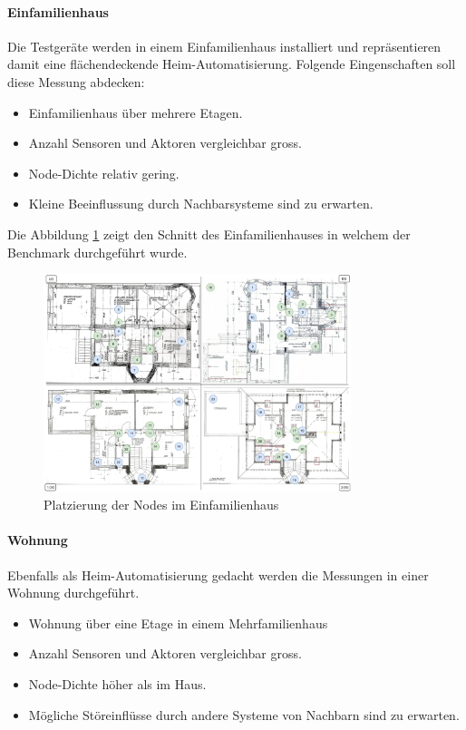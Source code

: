 \newpage
\paragraph{Einfamilienhaus}
Die Testgeräte werden in einem Einfamilienhaus installiert und repräsentieren damit eine flächendeckende Heim-Automatisierung. Folgende Eingenschaften soll diese Messung abdecken:
\begin{itemize}
	\item Einfamilienhaus über mehrere Etagen.
	\item Anzahl Sensoren und Aktoren vergleichbar gross.
	\item Node-Dichte relativ gering.
	\item Kleine Beeinflussung durch Nachbarsysteme sind zu erwarten.
\end{itemize}

Die Abbildung \ref{fig:Messumgebung2Einfamilienhaus} zeigt den Schnitt des Einfamilienhauses in welchem der Benchmark durchgeführt wurde.
\begin{figure}[h]
	\centering
	\includegraphics[width=0.8\textwidth]{graphics/Plan_Haus_Raffi.png}
	\caption{Platzierung der Nodes im Einfamilienhaus}\label{fig:Messumgebung2Einfamilienhaus}
\end{figure}

\newpage
\paragraph{Wohnung}
Ebenfalls als Heim-Automatisierung gedacht werden die Messungen in einer Wohnung durchgeführt.
\begin{itemize}
	\item Wohnung über eine Etage in einem Mehrfamilienhaus
	\item Anzahl Sensoren und Aktoren vergleichbar gross.
	\item Node-Dichte höher als im Haus.
	\item Mögliche Störeinflüsse durch andere Systeme von Nachbarn sind zu erwarten.
\end{itemize}


